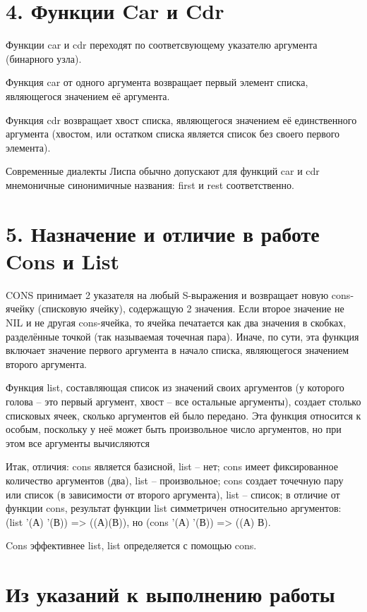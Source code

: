 \documentclass[12pt]{report}
\begin{document}
\section*{4. Функции Car и Cdr}

Функции car и cdr переходят по соответсвующему указателю аргумента (бинарного узла).

Функция car от одного аргумента возвращает первый элемент списка, являющегося значением её аргумента. 

Функция cdr возвращает хвост списка, являющегося значением её единственного аргумента (хвостом, или остатком списка является список  без своего первого элемента).  

Современные диалекты  Лиспа обычно допускают для функций car и cdr мнемоничные синонимичные названия: first и rest соответственно.

\section*{5. Назначение и отличие в работе Cons и List}

CONS принимает 2 указателя на любый S-выражения и возвращает новую cons-ячейку (списковую ячейку), содержащую 2 значения. Если второе значение не NIL и не другая cons-ячейка, то ячейка печатается как два значения в скобках, разделённые точкой (так называемая точечная пара). Иначе, по сути, эта функция включает значение первого аргумента в начало списка, являющегося значением второго аргумента. 

Функция list, составляющая список из значений своих аргументов (у которого голова -- это первый аргумент, хвост -- все остальные аргументы), создает столько списковых ячеек, сколько аргументов ей было передано. Эта функция относится к особым, поскольку у неё может быть произвольное число аргументов, но при этом все аргументы вычисляются

Итак, отличия: cons является базисной, list -- нет; cons имеет  фиксированное количество аргументов (два), list -- произвольное; cons создает точечную пару или список (в зависимости от второго аргумента), list -- список; в отличие от функции cons, результат функции list симметричен относительно аргументов: (list '(А) '(В)) => ((А)(В)), но (cons '(А) '(В)) => ((А) В).

Cons эффективнее list, list определяется с помощью cons.

 

\section*{Из указаний  к выполнению работы}
\end{document}
